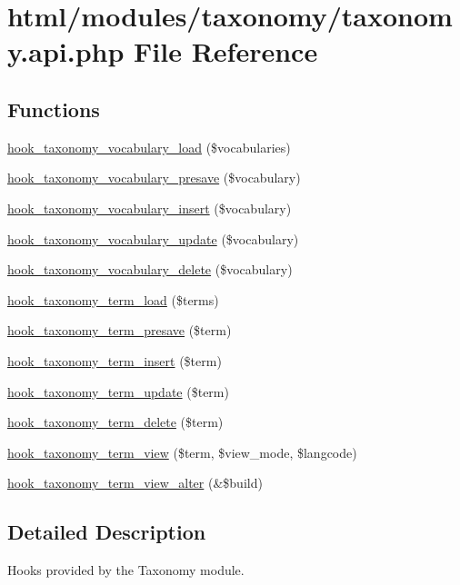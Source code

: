 \hypertarget{taxonomy_8api_8php}{
\section{html/modules/taxonomy/taxonomy.api.php File Reference}
\label{taxonomy_8api_8php}
}
\subsection*{Functions}
\begin{DoxyCompactItemize}
\item 
\hyperlink{group__hooks_ga2426242aecd7bc83f3201d2e87093b5c}{hook\_\-taxonomy\_\-vocabulary\_\-load} (\$vocabularies)
\item 
\hyperlink{group__hooks_ga8ec7aaf710eacd639ce92443139089d0}{hook\_\-taxonomy\_\-vocabulary\_\-presave} (\$vocabulary)
\item 
\hyperlink{group__hooks_ga438bdb494fe8b75625b9451e94165065}{hook\_\-taxonomy\_\-vocabulary\_\-insert} (\$vocabulary)
\item 
\hyperlink{group__hooks_gaf7e614327d1d3826d208fd6528df4a70}{hook\_\-taxonomy\_\-vocabulary\_\-update} (\$vocabulary)
\item 
\hyperlink{group__hooks_ga76a12ce251cd46c0b33f73a190f77d8d}{hook\_\-taxonomy\_\-vocabulary\_\-delete} (\$vocabulary)
\item 
\hyperlink{group__hooks_ga043d5ebe3d15a7ff5a84e8016a96467f}{hook\_\-taxonomy\_\-term\_\-load} (\$terms)
\item 
\hyperlink{group__hooks_ga2dad7857b3613834314f694e183e1fdb}{hook\_\-taxonomy\_\-term\_\-presave} (\$term)
\item 
\hyperlink{group__hooks_gabab3537accc8ce17fe2cd0f73f4bb817}{hook\_\-taxonomy\_\-term\_\-insert} (\$term)
\item 
\hyperlink{group__hooks_ga5c2477516245f0b9d6b04b8a8d227592}{hook\_\-taxonomy\_\-term\_\-update} (\$term)
\item 
\hyperlink{group__hooks_gab55fa1f290f3d43ea59795123154cf32}{hook\_\-taxonomy\_\-term\_\-delete} (\$term)
\item 
\hyperlink{group__hooks_gaeb73cbcc621835fb8f1d9114b3234bd5}{hook\_\-taxonomy\_\-term\_\-view} (\$term, \$view\_\-mode, \$langcode)
\item 
\hyperlink{group__hooks_gad02862e477fbc925f70a7f91d2916820}{hook\_\-taxonomy\_\-term\_\-view\_\-alter} (\&\$build)
\end{DoxyCompactItemize}


\subsection{Detailed Description}
Hooks provided by the Taxonomy module. 